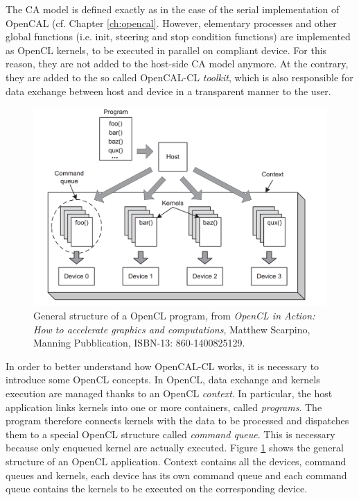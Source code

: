 The CA model is defined exactly as in the case of the serial
implementation of OpenCAL (cf. Chapter \ref{ch:opencal}. However,
elementary processes and other global functions (i.e. init, steering
and stop condition functions) are implemented as OpenCL kernels, to be
executed in parallel on compliant device. For this reason, they are
not added to the host-side CA model anymore. At the contrary, they are
added to the so called OpenCAL-CL \emph{toolkit}, which is also
responsible for data exchange between host and device in a transparent
manner to the user.

\begin{figure}[tp]
  \begin{center}
    \includegraphics[width=12cm]{./images/OpenCAL-CL/kernelDistribution}
    \caption{General structure of a OpenCL program, from \emph{OpenCL
        in Action: How to accelerate graphics and computations},
      Matthew Scarpino, Manning Pubblication, ISBN-13:
      860-1400825129.}
    \label{fig:GeneralStructure}
  \end{center}
\end{figure}

In order to better understand how OpenCAL-CL works, it is necessary to
introduce some OpenCL concepts. In OpenCL, data exchange and kernels
execution are managed thanks to an OpenCL \emph{context}. In
particular, the host application links kernels into one or more
containers, called \emph{programs}. The program therefore connects
kernels with the data to be processed and dispatches them to a special
OpenCL structure called \emph{command queue}. This is necessary
because only enqueued kernel are actually executed. Figure
\ref{fig:GeneralStructure} shows the general structure of an OpenCL
application. Context contains all the devices, command queues and
kernels, each device has its own command queue and each command queue
contains the kernels to be executed on the corresponding device.

